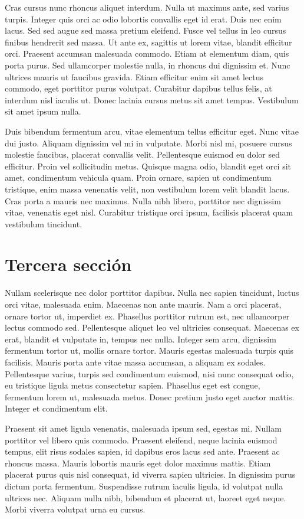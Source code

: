 Cras cursus nunc rhoncus aliquet interdum. Nulla ut maximus ante, sed varius turpis. Integer quis orci ac odio lobortis convallis eget id erat. Duis nec enim lacus. Sed sed augue sed massa pretium eleifend. Fusce vel tellus in leo cursus finibus hendrerit sed massa. Ut ante ex, sagittis ut lorem vitae, blandit efficitur orci. Praesent accumsan malesuada commodo. Etiam at elementum diam, quis porta purus. Sed ullamcorper molestie nulla, in rhoncus dui dignissim et. Nunc ultrices mauris ut faucibus gravida. Etiam efficitur enim sit amet lectus commodo, eget porttitor purus volutpat. Curabitur dapibus tellus felis, at interdum nisl iaculis ut. Donec lacinia cursus metus sit amet tempus. Vestibulum sit amet ipsum nulla.

Duis bibendum fermentum arcu, vitae elementum tellus efficitur eget. Nunc vitae dui justo. Aliquam dignissim vel mi in vulputate. Morbi nisl mi, posuere cursus molestie faucibus, placerat convallis velit. Pellentesque euismod eu dolor sed efficitur. Proin vel sollicitudin metus. Quisque magna odio, blandit eget orci sit amet, condimentum vehicula quam. Proin ornare, sapien ut condimentum tristique, enim massa venenatis velit, non vestibulum lorem velit blandit lacus. Cras porta a mauris nec maximus. Nulla nibh libero, porttitor nec dignissim vitae, venenatis eget nisl. Curabitur tristique orci ipsum, facilisis placerat quam vestibulum tincidunt.

\section{Tercera sección}

Nullam scelerisque nec dolor porttitor dapibus. Nulla nec sapien tincidunt, luctus orci vitae, malesuada enim. Maecenas non ante mauris. Nam a orci placerat, ornare tortor ut, imperdiet ex. Phasellus porttitor rutrum est, nec ullamcorper lectus commodo sed. Pellentesque aliquet leo vel ultricies consequat. Maecenas ex erat, blandit et vulputate in, tempus nec nulla. Integer sem arcu, dignissim fermentum tortor ut, mollis ornare tortor. Mauris egestas malesuada turpis quis facilisis. Mauris porta ante vitae massa accumsan, a aliquam ex sodales. Pellentesque varius, turpis sed condimentum euismod, nisi nunc consequat odio, eu tristique ligula metus consectetur sapien. Phasellus eget est congue, fermentum lorem ut, malesuada metus. Donec pretium justo eget auctor mattis. Integer et condimentum elit.

Praesent sit amet ligula venenatis, malesuada ipsum sed, egestas mi. Nullam porttitor vel libero quis commodo. Praesent eleifend, neque lacinia euismod tempus, elit risus sodales sapien, id dapibus eros lacus sed ante. Praesent ac rhoncus massa. Mauris lobortis mauris eget dolor maximus mattis. Etiam placerat purus quis nisl consequat, id viverra sapien ultricies. In dignissim purus dictum porta fermentum. Suspendisse rutrum iaculis ligula, id volutpat nulla ultrices nec. Aliquam nulla nibh, bibendum et placerat ut, laoreet eget neque. Morbi viverra volutpat urna eu cursus.

